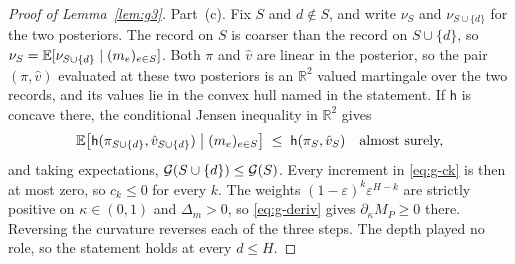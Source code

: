 \begin{proof}[Proof of Lemma~\ref{lem:g3}]
Part~(c). Fix $S$ and $d \notin S$, and write $\nu_S$ and $\nu_{S\cup\{d\}}$ for the two
posteriors. The record on $S$ is coarser than the record on $S\cup\{d\}$, so
$\nu_S = \mathbb{E}[\nu_{S\cup\{d\}} \mid (m_e)_{e\in S}]$. Both $\pi$ and $\hat v$ are linear in the
posterior, so the pair $(\pi,\hat v)$ evaluated at these two posteriors is an $\mathbb R^2$ valued
martingale over the two records, and its values lie in the convex hull named in the statement. If
$\mathsf h$ is concave there, the conditional Jensen inequality in $\mathbb R^2$ gives
\[
\mathbb{E}\bigl[\mathsf h(\pi_{S\cup\{d\}},\hat v_{S\cup\{d\}}) \bigm| (m_e)_{e\in S}\bigr]
\;\le\; \mathsf h(\pi_S, \hat v_S)
\quad\text{almost surely,}
\]
and taking expectations, $\mathcal{G}(S\cup\{d\}) \le \mathcal{G}(S)$. Every increment in \eqref{eq:g-ck} is
then at most zero, so $c_k \le 0$ for every $k$. The weights $(1-\varepsilon)^k\varepsilon^{H-k}$
are strictly positive on $\kappa \in (0,1)$ and $\Delta_m > 0$, so \eqref{eq:g-deriv} gives
$\partial_\kappa M_P \ge 0$ there. Reversing the curvature reverses each of the three steps. The
depth played no role, so the statement holds at every $d \le H$.
\end{proof}

